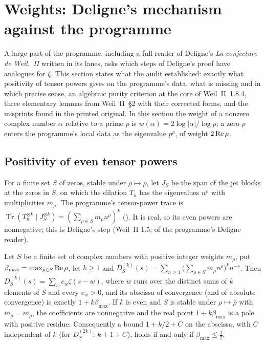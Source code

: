 \section{Weights: Deligne's mechanism against the programme}\label{sec:deligne}

A large part of the programme, including a full reader of Deligne's \emph{La conjecture de Weil.~II} \cite{DeligneWeilII} written in its lanes, asks which steps of Deligne's proof have analogues for $\zeta$.
This section states what the audit established: exactly what positivity of tensor powers gives on the programme's data, what is missing and in which precise sense, an algebraic purity criterion at the core of Weil~II~1.8.4, three elementary lemmas from Weil~II~§2 with their corrected forms, and the misprints found in the printed original.
In this section the weight of a nonzero complex number $\alpha$ relative to a prime $p$ is $w(\alpha)=2\log|\alpha|/\log p$; a zero $\rho$ enters the programme's local data as the eigenvalue $p^\rho$, of weight $2\operatorname{Re}\rho$.

\subsection{Positivity of even tensor powers}

For a finite set $S$ of zeros, stable under $\rho\mapsto\bar\rho$, let $J_S$ be the span of the jet blocks at the zeros in $S$, on which the dilation $T_n$ has the eigenvalues $n^\rho$ with multiplicities $m_\rho$. The programme's tensor-power trace is $\operatorname{Tr}(T_n^{\otimes k}\mid J_S^{\otimes k})=(\sum_{\rho\in S}m_\rho n^\rho)^k$ (). It is real, so its even powers are nonnegative; this is Deligne's step (Weil~II 1.5;  of the programme's Deligne reader).

\begin{proposition}\label{prop:abscissa}
Let $S$ be a finite set of complex numbers with positive integer weights $m_\rho$, put $\beta_{\max}=\max_{\rho\in S}\operatorname{Re}\rho$, let $k\ge1$ and $D_S^{(k)}(s)=\sum_{n\ge1}\big(\sum_{\rho\in S}m_\rho n^\rho\big)^{k}n^{-s}$. Then $D_S^{(k)}(s)=\sum_wc_w\zeta(s-w)$, where $w$ runs over the distinct sums of $k$ elements of $S$ and every $c_w>0$, and its abscissa of convergence (and of absolute convergence) is exactly $1+k\beta_{\max}$. If $k$ is even and $S$ is stable under $\rho\mapsto\bar\rho$ with $m_{\bar\rho}=m_\rho$, the coefficients are nonnegative and the real point $1+k\beta_{\max}$ is a pole with positive residue. Consequently a bound $1+k/2+C$ on the abscissa, with $C$ independent of $k$ (for $D_S^{(2k)}$: $k+1+C$), holds if and only if $\beta_{\max}\le\tfrac12$.
\end{proposition}

